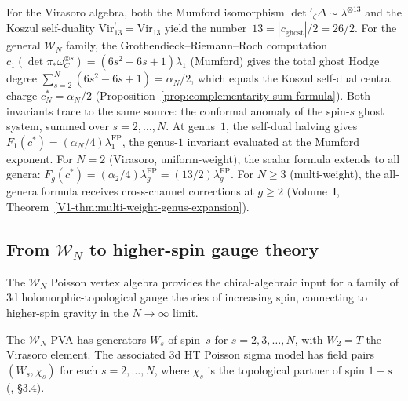 \begin{remark}[Mumford exponent $=$ Koszul self-dual point]
\label{rem:mumford-koszul}
For the Virasoro algebra, both the Mumford isomorphism
$\det{}'_\zeta\Delta \sim \lambda^{\otimes 13}$ and the Koszul
self-duality $\mathrm{Vir}_{13}^! = \mathrm{Vir}_{13}$ yield the
number~$13 = |c_{\mathrm{ghost}}|/2 = 26/2$. For the general
$\mathcal{W}_N$ family, the Grothendieck--Riemann--Roch computation
$c_1(\det\pi_*\omega_C^{\otimes s}) = (6s^2-6s+1)\lambda_1$
(Mumford) gives the total ghost Hodge degree
$\sum_{s=2}^N(6s^2-6s+1) = \alpha_N/2$, which equals the
Koszul self-dual central charge $c_N^* = \alpha_N/2$
\textup{(}Proposition~\textup{\ref{prop:complementarity-sum-formula})}.
Both invariants trace to the same source: the conformal anomaly
of the spin-$s$ ghost system, summed over $s = 2,\ldots,N$.
At genus~$1$, the self-dual halving gives
$F_1(c^*) = (\alpha_N/4)\lambda_1^{\mathrm{FP}}$,
the genus-$1$ invariant evaluated at the Mumford exponent.
For $N = 2$ (Virasoro, uniform-weight), the scalar formula
extends to all genera: $F_g(c^*) = (\alpha_2/4)\lambda_g^{\mathrm{FP}}
= (13/2)\lambda_g^{\mathrm{FP}}$.
For $N \ge 3$ (multi-weight), the all-genera formula receives
cross-channel corrections at $g \ge 2$
(Volume~I, Theorem~\ref{V1-thm:multi-weight-genus-expansion}).
\end{remark}


\subsection{From \texorpdfstring{$\mathcal{W}_N$}{W\_N} to higher-spin gauge theory}

\providecommand{\ModEnv}{\operatorname{ModEnv}}

The $\mathcal{W}_N$ Poisson vertex algebra provides the chiral-algebraic
input for a family of 3d holomorphic-topological gauge theories of
increasing spin, connecting to higher-spin gravity in the $N \to \infty$
limit.

\begin{definition}
The $\mathcal{W}_N$ PVA has generators $W_s$ of spin~$s$ for
$s = 2, 3, \ldots, N$, with $W_2 = T$ the Virasoro element. The
associated 3d HT Poisson sigma model has field pairs $(W_s, \chi_s)$
for each $s = 2, \ldots, N$, where $\chi_s$ is the topological partner
of spin $1-s$ \textup{(}\!\cite{KZ25}, \S3.4\textup{)}.
\end{definition}

